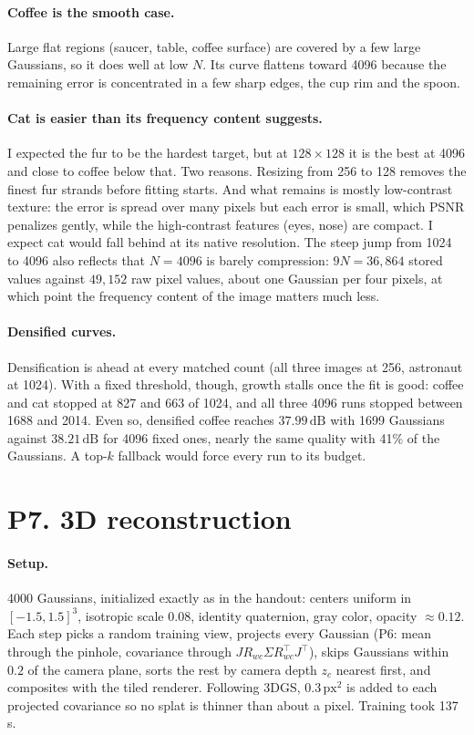 \documentclass[11pt]{article}
\newcommand{\dB}{\,\mathrm{dB}}
\begin{document}
\paragraph{Coffee is the smooth case.} Large flat regions (saucer, table, coffee surface) are covered by a few large Gaussians, so it does well at low $N$. Its curve flattens toward 4096 because the remaining error is concentrated in a few sharp edges, the cup rim and the spoon.

\paragraph{Cat is easier than its frequency content suggests.} I expected the fur to be the hardest target, but at $128\times128$ it is the best at 4096 and close to coffee below that. Two reasons. Resizing from 256 to 128 removes the finest fur strands before fitting starts. And what remains is mostly low-contrast texture: the error is spread over many pixels but each error is small, which PSNR penalizes gently, while the high-contrast features (eyes, nose) are compact. I expect cat would fall behind at its native resolution. The steep jump from 1024 to 4096 also reflects that $N=4096$ is barely compression: $9N=36{,}864$ stored values against $49{,}152$ raw pixel values, about one Gaussian per four pixels, at which point the frequency content of the image matters much less.

\paragraph{Densified curves.} Densification is ahead at every matched count (all three images at 256, astronaut at 1024). With a fixed threshold, though, growth stalls once the fit is good: coffee and cat stopped at 827 and 663 of 1024, and all three 4096 runs stopped between 1688 and 2014. Even so, densified coffee reaches $37.99\dB$ with 1699 Gaussians against $38.21\dB$ for 4096 fixed ones, nearly the same quality with 41\% of the Gaussians. A top-$k$ fallback would force every run to its budget.

\section*{P7. 3D reconstruction}

\paragraph{Setup.} 4000 Gaussians, initialized exactly as in the handout: centers uniform in $[-1.5,1.5]^3$, isotropic scale $0.08$, identity quaternion, gray color, opacity $\approx0.12$. Each step picks a random training view, projects every Gaussian (P6: mean through the pinhole, covariance through $J R_{wc}\Sigma R_{wc}^\top J^\top$), skips Gaussians within $0.2$ of the camera plane, sorts the rest by camera depth $z_c$ nearest first, and composites with the tiled renderer. Following 3DGS, $0.3\,\mathrm{px}^2$ is added to each projected covariance so no splat is thinner than about a pixel. Training took 137\,s.
\end{document}
